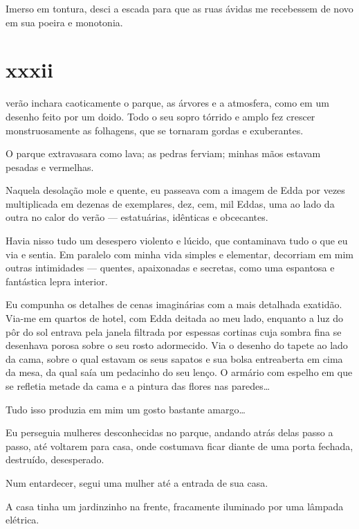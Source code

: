 
Imerso em tontura, desci a escada para que as ruas ávidas me recebessem de
novo em sua poeira e monotonia.


\section{xxxii} 

verão inchara caoticamente o parque, as árvores e a atmosfera,
 como em um desenho feito por um doido. Todo o seu sopro tórrido e amplo fez crescer monstruosamente as folhagens, que
se tornaram gordas e exuberantes.

O parque extravasara como lava; as pedras ferviam; minhas mãos estavam pesadas
e vermelhas.

Naquela desolação mole e quente, eu passeava com a imagem de Edda por vezes
multiplicada em dezenas de exemplares, dez, cem, mil Eddas, uma ao lado da
outra no calor do verão --- estatuárias, idênticas e obcecantes.

Havia nisso tudo um desespero violento e lúcido, que contaminava tudo o que eu
via e sentia. Em paralelo com minha vida simples e elementar, decorriam em
mim outras intimidades --- quentes, apaixonadas e secretas, como uma
espantosa e fantástica lepra interior.

Eu compunha os detalhes de cenas imaginárias com a mais detalhada exatidão.
Via-me em quartos de hotel, com Edda deitada ao meu lado, enquanto a luz do
pôr do sol entrava pela janela filtrada por espessas cortinas cuja sombra
fina se desenhava porosa sobre o seu rosto adormecido. Via o desenho do
tapete ao lado da cama, sobre o qual estavam os seus sapatos e sua bolsa
entreaberta em cima da mesa, da qual saía um pedacinho do seu lenço. O
armário com espelho em que se refletia metade da cama e a pintura das flores
nas paredes\ldots{}

Tudo isso produzia em mim um gosto bastante amargo\ldots{}

Eu perseguia mulheres desconhecidas no parque, andando atrás delas passo a
passo, até voltarem para casa, onde costumava ficar diante de uma porta
fechada, destruído, desesperado.

Num entardecer, segui uma mulher até a entrada de sua casa.

A casa tinha um jardinzinho na frente, fracamente iluminado por uma lâmpada
elétrica.

